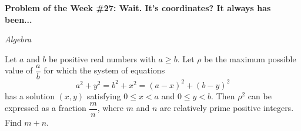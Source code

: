 \begin{potw}\vspace{5pt}
{\large\textbf{Problem of the Week \#27: Wait. It's coordinates? It always has been...}}\vspace{5pt}

\textit{Algebra}\V

Let $a$ and $b$ be positive real numbers with $a \ge b$. Let $\rho$ be the maximum possible value of $\dfrac{a}{b}$ for which the system of equations\[a^2 + y^2 = b^2 + x^2 = (a-x)^2 + (b-y)^2\]has a solution $(x,y)$ satisfying $0 \le x < a$ and $0 \le y < b$. Then $\rho^2$ can be expressed as a fraction $\dfrac{m}{n}$, where $m$ and $n$ are relatively prime positive integers. Find $m + n$.
\end{potw}\V

